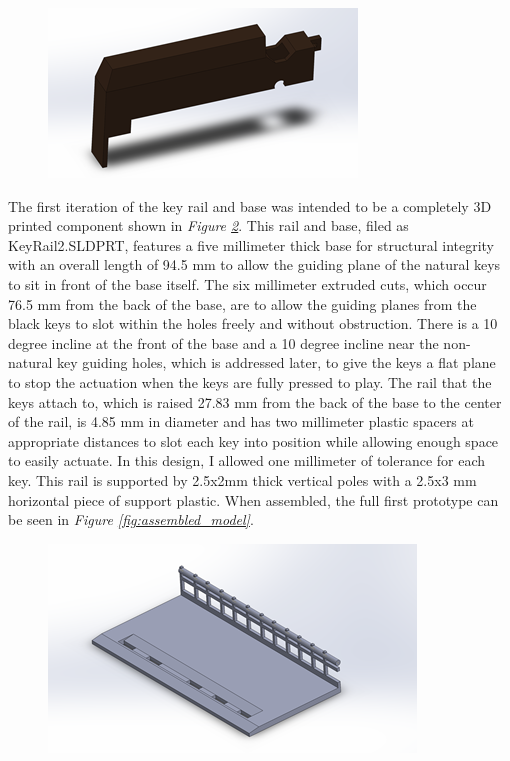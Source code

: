 \begin{figure}[h!]
  \centering
  \includegraphics[width=0.7\linewidth]{image/BlackModel.png}
  \caption{}
  \label{fig:black_model}
\end{figure}

The first iteration of the key rail and base was intended to be a completely 3D printed component shown in \textit{Figure \ref{fig:base_model1}}. This rail and base, filed as KeyRail2.SLDPRT, features a five millimeter thick base for structural integrity with an overall length of 94.5 mm to allow the guiding plane of the natural keys to sit in front of the base itself. The six millimeter extruded cuts, which occur 76.5 mm from the back of the base, are to allow the guiding planes from the black keys to slot within the holes freely and without obstruction. There is a 10 degree incline at the front of the base and a 10 degree incline near the non-natural key guiding holes, which is addressed later, to give the keys a flat plane to stop the actuation when the keys are fully pressed to play. The rail that the keys attach to, which is raised 27.83 mm from the back of the base to the center of the rail, is 4.85 mm in diameter and has two millimeter plastic spacers at appropriate distances to slot each key into position while allowing enough space to easily actuate. In this design, I allowed one millimeter of tolerance for each key. This rail is supported by 2.5x2mm thick vertical poles with a 2.5x3 mm horizontal piece of support plastic. When assembled, the full first prototype can be seen in \textit{Figure \ref{fig:assembled_model}}.

\begin{figure}[h!]
  \centering
  \includegraphics[width=0.8\linewidth]{image/BaseModel1.png}
  \caption{}
  \label{fig:base_model1}
\end{figure}

